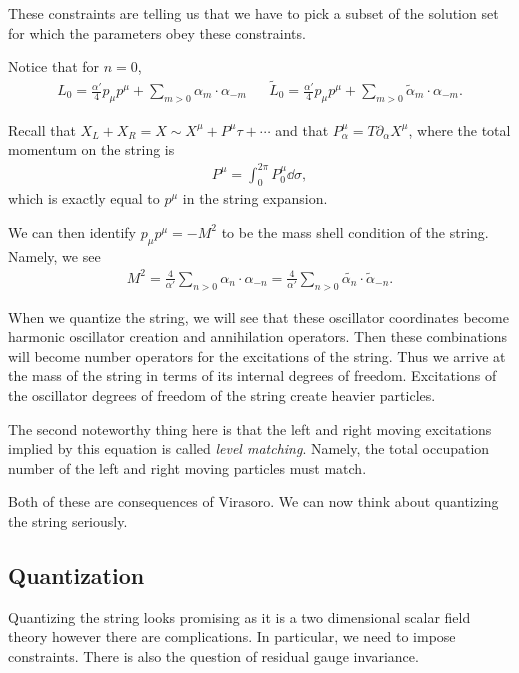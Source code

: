 These constraints are telling us that we have to pick a subset of the solution set for which the parameters obey these constraints.

Notice that for $n = 0$,
\begin{align}
    L_0 = \frac{\alpha'}{4} p_\mu p^{\mu} + \sum_{m > 0}^{} \alpha_m \cdot \alpha_{-m} && \widetilde{L}_0 = \frac{\alpha'}{4} p_\mu p^{\mu} + \sum_{m > 0}^{} \widetilde{\alpha}_m \cdot \alpha_{-m}
.\end{align}

Recall that $X_L + X_R = X \sim  X^{\mu} + P^{\mu} \tau + \cdots$ and that $P_\alpha^{\mu} = T \partial_\alpha X^{\mu}$, where the total momentum on the string is
\begin{align}
    P^{\mu} = \int_0^{2\pi} P_{0}^{\mu} \dd{\sigma}
,\end{align}
which is exactly equal to $p^{\mu}$ in the string expansion.

We can then identify $p_\mu p^{\mu} = - M^2$ to be the mass shell condition of the string. Namely, we see
\begin{align}
    M^2 = \frac{4}{\alpha'} \sum_{n > 0}^{}  \alpha_n \cdot \alpha_{-n} = \frac{4}{\alpha'} \sum_{n > 0}^{} \widetilde{\alpha_n} \cdot \widetilde{\alpha}_{-n}
.\end{align}

When we quantize the string, we will see that these oscillator coordinates become harmonic oscillator creation and annihilation operators. Then these combinations will become number operators for the excitations of the string. Thus we arrive at the mass of the string in terms of its internal degrees of freedom. Excitations of the oscillator degrees of freedom of the string create heavier particles.

The second noteworthy thing here is that the left and right moving excitations implied by this equation is called \emph{level matching}. Namely, the total occupation number of the left and right moving particles must match. 

Both of these are consequences of Virasoro. We can now think about quantizing the string seriously.

\subsection{Quantization}

Quantizing the string looks promising as it is a two dimensional scalar field theory however there are complications. In particular, we need to impose constraints. There is also the question of residual gauge invariance.

